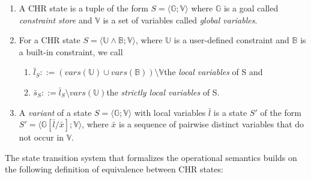 \documentclass[acmtocl]{acmtrans2m}
\newcommand\state[1]{\langle #1 \rangle}
\newcommand{\B}{\ensuremath{\mathbb{B}}}
\newcommand{\U}{\ensuremath{\mathbb{U}}}
\newcommand{\V}{\ensuremath{\mathbb{V}}}
\newcommand{\G}{\ensuremath{\mathbb{G}}}
\newcommand{\bl}{\bar{l}}
\newcommand{\bs}{\bar{s}}
\newcommand{\bx}{\bar{x}}
\begin{document}
\begin{definition}
\label{def:binary-state}
\begin{enumerate}
\item  A CHR state is a tuple of the form $S = \state{\G;\V}$ where $\G$ is a
goal called \emph{constraint store} and $\V$ is a set of variables called
\emph{global variables}.
\item For a CHR state $S=\state{\U\wedge\B;\V}$, where $\U$ is a
user-defined constraint and $\B$ is a built-in constraint, we
call
\begin{enumerate}
\item $\bl_S ::= ( vars(\U)\cup vars(\B) ) \setminus \V$\quad the
\emph{local variables} of S and
\item $\bs_S ::= \bl_S \setminus vars(\U)$\quad the \emph{strictly local
variables} of S.
\end{enumerate}
\item A \emph{variant} of a state $S = \state{\G;\V}$ with local variables
$\bl$ is a state $S'$ of the form $S'=\state{\G[\bl/\bx];\V}$, where $\bx$ is a sequence
of pairwise distinct variables that do not occur in $\V$.
\end{enumerate}
\end{definition}

The state transition system that formalizes the operational semantics
builds on the following definition of equivalence
between CHR states:
\end{document}
